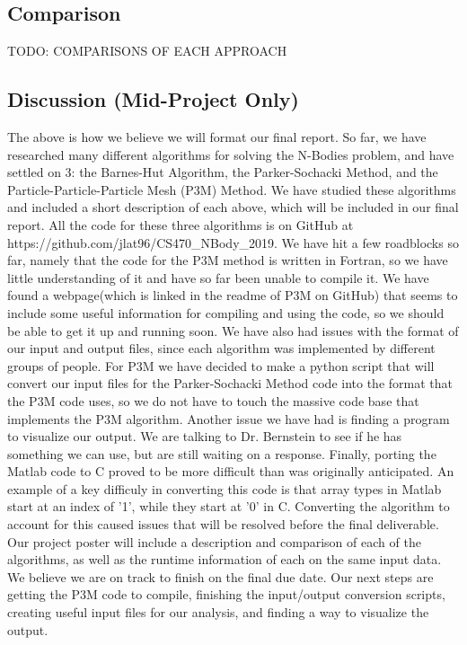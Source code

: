 \documentclass[11pt]{article}
\begin{document}
\begin{center}
\section*{Comparison}
\end{center}
TODO: COMPARISONS OF EACH APPROACH
\begin{center}
\section*{Discussion (Mid-Project Only)}
\end{center}
The above is how we believe we will format our final report. So far, we have researched many different algorithms for solving the N-Bodies problem, and have settled on 3: the Barnes-Hut Algorithm, the Parker-Sochacki Method, and the Particle-Particle-Particle Mesh (P3M) Method. We have studied these algorithms and included a short description of each above, which will be included in our final report. All the code for these three algorithms is on GitHub at \newline https://github.com/jlat96/CS470\_NBody\_2019.
\newline \newline
We have hit a few roadblocks so far, namely that the code for the P3M method is written in Fortran, so we have little understanding of it and have so far been unable to compile it. We have found a webpage(which is linked in the readme of P3M on GitHub) that seems to include some useful information for compiling and using the code, so we should be able to get it up and running soon. We have also had issues with the format of our input and output files, since each algorithm was implemented by different groups of people. For P3M we have decided to make a python script that will convert our input files for the Parker-Sochacki Method code into the format that the P3M code uses, so we do not have to touch the massive code base that implements the P3M algorithm. Another issue we have had is finding a program to visualize our output. We are talking to Dr. Bernstein to see if he has something we can use, but are still waiting on a response. Finally, porting the Matlab code to C proved to be more difficult than was originally anticipated. An example of a key difficuly in converting this code is that array types in Matlab start at an index of '1', while they start at '0' in C. Converting the algorithm to account for this caused issues that will be resolved before the final deliverable.
\newline \newline
Our project poster will include a description and comparison of each of the algorithms, as well as the runtime information of each on the same input data.
\newline \newline
We believe we are on track to finish on the final due date. Our next steps are getting the P3M code to compile, finishing the input/output conversion scripts, creating useful input files for our analysis, and finding a way to visualize the output.
\end{document}
